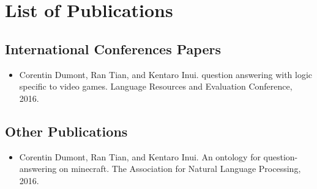 \documentclass[12pt]{article}
\begin{document}
\newpage
\section*{List of Publications}
\subsection*{International Conferences Papers}

\begin{itemize}
\item Corentin Dumont, Ran Tian, and Kentaro Inui. question answering with
logic specific to video games. Language Resources and Evaluation Conference, 2016.
\end{itemize}

\subsection*{Other Publications}

\begin{itemize}
\item Corentin Dumont, Ran Tian, and Kentaro Inui. An ontology for question-
answering on minecraft. The Association for Natural Language Processing, 2016.
\end{itemize}

\end{document}
